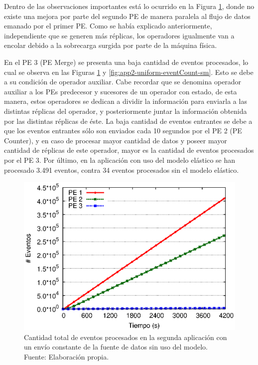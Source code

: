Dentro de las observaciones importantes está lo ocurrido en la Figura \ref{fig:app2-uniform-eventCount-cm}, donde no existe una mejora por parte del segundo PE de manera paralela al flujo de datos emanado por el primer PE. Como se había explicado anteriormente, independiente que se generen más réplicas, los operadores igualmente van a encolar debido a la sobrecarga surgida por parte de la máquina física.

En el PE 3 (PE Merge) se presenta una baja cantidad de eventos procesados, lo cual se observa en las Figuras \ref{fig:app2-uniform-eventCount-cm} y \ref{fig:app2-uniform-eventCount-sm}. Esto se debe a su condición de operador auxiliar. Cabe recordar que se denomina operador auxiliar a los PEs predecesor y sucesores de un operador con estado, de esta manera, estos operadores se dedican a dividir la información para enviarla a las distintas réplicas del operador, y posteriormente juntar la información obtenida por las distintas réplicas de éste. La baja cantidad de eventos entrantes se debe a que los eventos entrantes sólo son enviados cada 10 segundos por el PE 2 (PE Counter), y en caso de procesar mayor cantidad de datos y poseer mayor cantidad de réplicas de este operador, mayor es la cantidad de eventos procesados por el PE 3. Por último, en la aplicación con uso del modelo elástico se han procesado 3.491 eventos, contra 34 eventos procesados sin el modelo elástico.

\begin{figure}[!ht]
	\centering
	\captionsetup{justification=centering}
    \includegraphics[scale=0.7]{images/exp/app2/uniform/cm/eventCount.eps}
    \caption[Cantidad total de eventos procesados en la segunda aplicación con un envío constante de la fuente de datos sin uso del modelo.]{Cantidad total de eventos procesados en la segunda aplicación con un envío constante de la fuente de datos sin uso del modelo.\\Fuente: Elaboración propia.}
    \label{fig:app2-uniform-eventCount-cm}
\end{figure}

